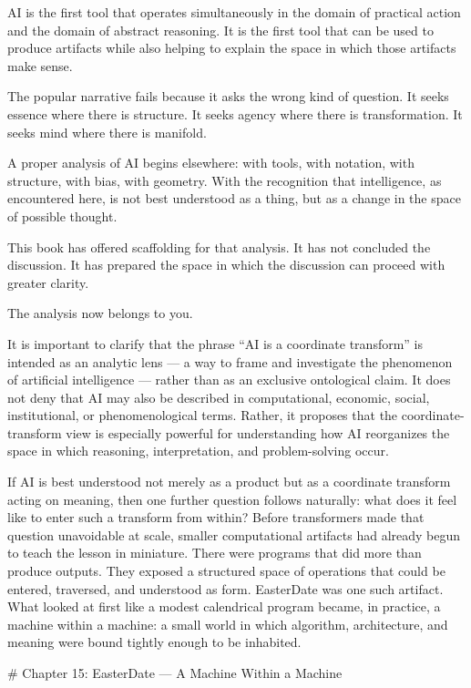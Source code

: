\documentclass[
]{article}
\begin{document}
AI is the first tool that operates simultaneously in the domain of
practical action and the domain of abstract reasoning. It is the first
tool that can be used to produce artifacts while also helping to explain
the space in which those artifacts make sense.

The popular narrative fails because it asks the wrong kind of question.
It seeks essence where there is structure. It seeks agency where there
is transformation. It seeks mind where there is manifold.

A proper analysis of AI begins elsewhere: with tools, with notation,
with structure, with bias, with geometry. With the recognition that
intelligence, as encountered here, is not best understood as a thing,
but as a change in the space of possible thought.

This book has offered scaffolding for that analysis. It has not
concluded the discussion. It has prepared the space in which the
discussion can proceed with greater clarity.

The analysis now belongs to you.

It is important to clarify that the phrase ``AI is a coordinate
transform'' is intended as an analytic lens --- a way to frame and
investigate the phenomenon of artificial intelligence --- rather than as
an exclusive ontological claim. It does not deny that AI may also be
described in computational, economic, social, institutional, or
phenomenological terms. Rather, it proposes that the
coordinate-transform view is especially powerful for understanding how
AI reorganizes the space in which reasoning, interpretation, and
problem-solving occur.

If AI is best understood not merely as a product but as a coordinate
transform acting on meaning, then one further question follows
naturally: what does it feel like to enter such a transform from within?
Before transformers made that question unavoidable at scale, smaller
computational artifacts had already begun to teach the lesson in
miniature. There were programs that did more than produce outputs. They
exposed a structured space of operations that could be entered,
traversed, and understood as form. EasterDate was one such artifact.
What looked at first like a modest calendrical program became, in
practice, a machine within a machine: a small world in which algorithm,
architecture, and meaning were bound tightly enough to be inhabited.

\newpage
\vspace*{3cm}
\begin{center}
# Chapter 15: EasterDate — A Machine Within a Machine
\end{center}
\end{document}
